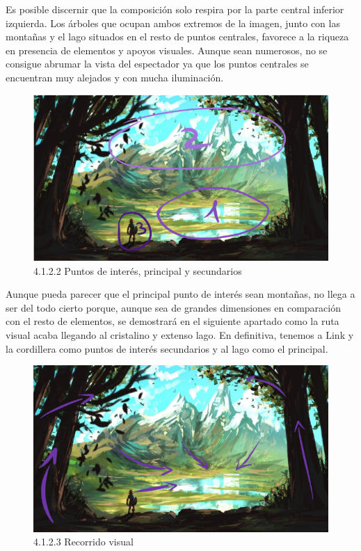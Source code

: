 \documentclass[12pt]{article}
\begin{document}
    Es posible discernir que la composición solo respira por la parte central inferior izquierda. Los árboles que ocupan ambos extremos de la imagen, junto con las montañas y el lago situados en el resto de puntos centrales, favorece a la riqueza en presencia de elementos y apoyos visuales. Aunque sean numerosos, no se consigue abrumar la vista del espectador ya que los puntos centrales se encuentran muy alejados y con mucha iluminación.

    \begin{figure}[H]
      \centering
      \includegraphics[width=\textwidth]{images/Nerea/Nerea Zelda concept 122.PNG}
      \caption{\small 4.1.2.2 Puntos de interés, principal y secundarios}
    \end{figure}

    Aunque pueda parecer que el principal punto de interés sean montañas, no llega a ser del todo cierto porque, aunque sea de grandes dimensiones en comparación con el resto de elementos, se demostrará en el siguiente apartado como la ruta visual acaba llegando al cristalino y extenso lago. En definitiva, tenemos a Link y la cordillera como puntos de interés secundarios y al lago como el principal.

    \begin{figure}[H]
      \centering
      \includegraphics[width=\textwidth]{images/Nerea/Nerea Zelda concept 123.PNG}
      \caption{\small 4.1.2.3 Recorrido visual}
    \end{figure}
\end{document}
